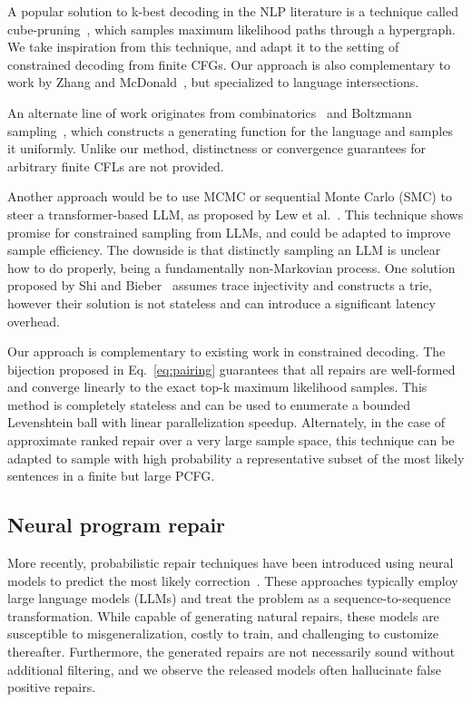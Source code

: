\documentclass[sigplan,acmsmall,nonacm,screen]{acmart}\settopmatter{printfolios=false,printccs=false,printacmref=false}
\begin{document}
A popular solution to k-best decoding in the NLP literature is a technique called cube-pruning~\cite{huang2005better, huang2007forest, chiang2007hierarchical}, which samples maximum likelihood paths through a hypergraph. We take inspiration from this technique, and adapt it to the setting of constrained decoding from finite CFGs. Our approach is also complementary to work by Zhang and McDonald~\cite{zhang2012generalized}, but specialized to language intersections.

  An alternate line of work originates from combinatorics~\cite{hickey1983uniform, gore1997quasi} and Boltzmann sampling~\cite{duchon2004boltzmann}, which constructs a generating function for the language and samples it uniformly. Unlike our method, distinctness or convergence guarantees for arbitrary finite CFLs are not provided.

  Another approach would be to use MCMC or sequential Monte Carlo (SMC) to steer a transformer-based LLM, as proposed by Lew et al.~\cite{lew2023sequential}. This technique shows promise for constrained sampling from LLMs, and could be adapted to improve sample efficiency. The downside is that distinctly sampling an LLM is unclear how to do properly, being a fundamentally non-Markovian process. One solution proposed by Shi and Bieber~\cite{shi2020incremental} assumes trace injectivity and constructs a trie, however their solution is not stateless and can introduce a significant latency overhead.

  Our approach is complementary to existing work in constrained decoding. The bijection proposed in Eq.~\ref{eq:pairing} guarantees that all repairs are well-formed and converge linearly to the exact top-k maximum likelihood samples. This method is completely stateless and can be used to enumerate a bounded Levenshtein ball with linear parallelization speedup. Alternately, in the case of approximate ranked repair over a very large sample space, this technique can be adapted to sample with high probability a representative subset of the most likely sentences in a finite but large PCFG.

  \subsection{Neural program repair}

  More recently, probabilistic repair techniques have been introduced using neural models to predict the most likely correction~\cite{allamanis2021self, chirkova2021empirical, drain2021generating}. These approaches typically employ large language models (LLMs) and treat the problem as a sequence-to-sequence transformation. While capable of generating natural repairs, these models are susceptible to misgeneralization, costly to train, and challenging to customize thereafter. Furthermore, the generated repairs are not necessarily sound without additional filtering, and we observe the released models often hallucinate false positive repairs.
\end{document}
